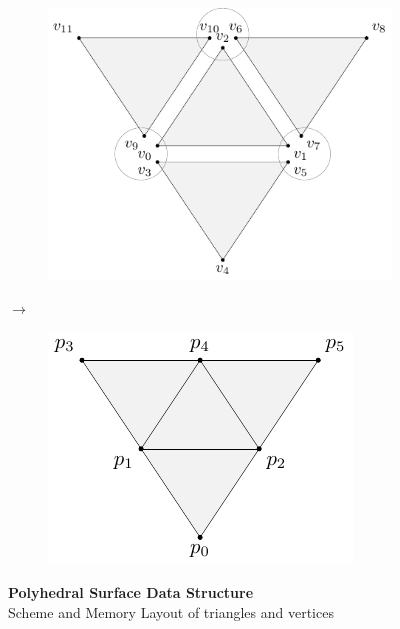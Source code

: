 \documentclass{stdlocal}
\begin{document}
  \begin{figure}[h]
    \centering
    \begin{subfigure}[c]{0.40\linewidth}
      \centering
      \includegraphics[width=\linewidth]{figures/polyhedral-surface-separated.pdf}
    \end{subfigure}
    \hfill
    $\longrightarrow$
    \hfill
    \begin{subfigure}[c]{0.40\linewidth}
      \centering
      \includegraphics[width=\linewidth]{figures/polyhedral-surface-joint.pdf}
    \end{subfigure}
    \caption[Polyhedral Surface Data Structure]{%
      \textbf{Polyhedral Surface Data Structure}\\
      Scheme and Memory Layout of triangles and vertices
    }
  \end{figure}
\end{document}
